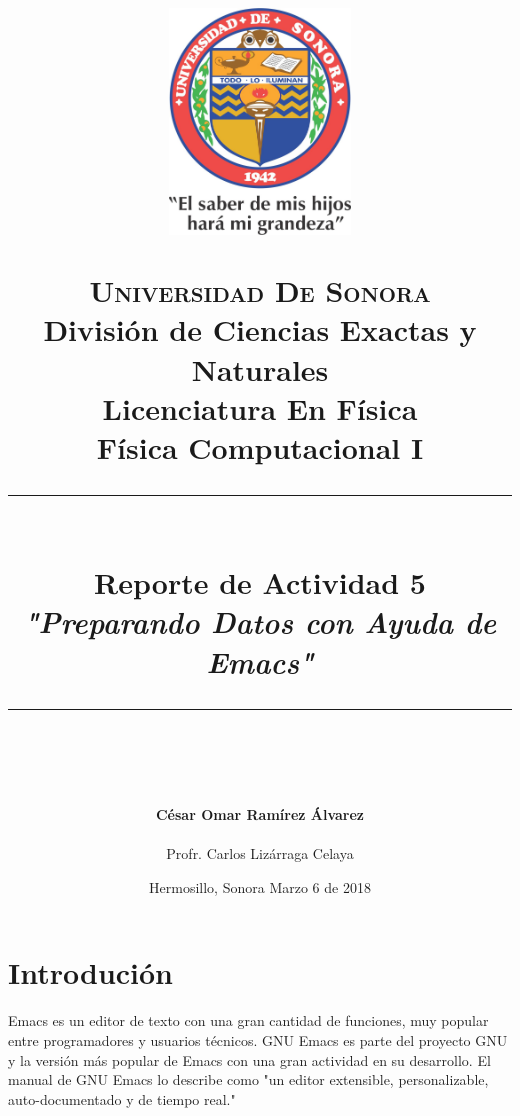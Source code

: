 \documentclass[12pt]{article}
\newcommand{\HRule}[1]{\rule{\linewidth}{#1}}
\begin{document}
\begin{titlepage}

\title{ \normalsize 
        \begin{center}
        \includegraphics[height=6cm]{Logo.jpg}
        \end{center}
        \LARGE \textsc{\textbf{Universidad De Sonora}} \\ \bigskip
		\Large División de Ciencias Exactas y Naturales \\
        Licenciatura En Física \\ \bigskip
        \bigskip
        Física Computacional I
		\\ [0.1cm]  
		\HRule{2pt} \\
		\Large \textbf{{Reporte de Actividad 5}} \\
        \textit{\textbf{"Preparando Datos con Ayuda de Emacs"}}
		\HRule{2pt} \\
		\normalsize \vspace*{0.001\baselineskip}}
        
\date{\bigskip \Large Hermosillo, Sonora  \hspace*{\fill}  Marzo 6 de 2018}

        
\author{
		\Large\textbf{ César Omar Ramírez Álvarez} \\ \bigskip
        \\ \bigskip
       \Large Profr. Carlos Lizárraga Celaya}
       \end{titlepage}
       \maketitle
       

\newpage
\pagestyle{plain}

\section*{Introdución}
Emacs es un editor de texto con una gran cantidad de funciones, muy popular entre programadores y usuarios técnicos. GNU Emacs es parte del proyecto GNU y la versión más popular de Emacs con una gran actividad en su desarrollo. El manual de GNU Emacs lo describe como "un editor extensible, personalizable, auto-documentado y de tiempo real."\\
\end{document}
